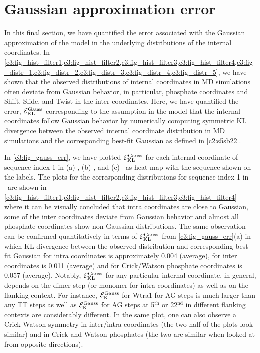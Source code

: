 \section{Gaussian approximation error}\label{c3:s7}
In this final section, we have quantified the error associated with the Gaussian approximation of the model in the underlying distributions of the internal coordinates.
In \cref{c3:fig_hist_filter1,c3:fig_hist_filter2,c3:fig_hist_filter3,c3:fig_hist_filter4,c3:fig_distr_1,c3:fig_distr_2,c3:fig_distr_3,c3:fig_distr_4,c3:fig_distr_5}, we have shown that the observed distributions of internal coordinates in MD simulations often deviate from Gaussian behavior, in particular, phosphate coordinates and Shift, Slide, and Twist in the inter-coordinates.
Here, we have quantified the error, ${\mathcal E}_{\text{KL}}^{\text{Gauss}}$ corresponding to the assumption in the model that the internal coordinates follow Gaussian behavior by numerically computing symmetric KL divergence between the observed internal coordinate distribution in MD simulations and the corresponding best-fit Gaussian as defined in \cref{c2:s5sb22}.

In \cref{c3:fig_gauss_err}, we have plotted ${\mathcal E}_{\text{KL}}^{\text{Gauss}}$ for each internal coordinate of sequence index 1 in (a) \Lbdna, (b) \Lbrna, and (c) \Lbdrh \ as heat map with the sequence shown on the labels. 
The plots for the corresponding distributions for sequence index 1 in \Lbdna \ are shown in \cref{c3:fig_hist_filter1,c3:fig_hist_filter2,c3:fig_hist_filter3,c3:fig_hist_filter4} where it can be visually concluded that intra coordinates are close to Gaussian, some of the inter coordinates deviate from Gaussian behavior and almost all phosphate coordinates show non-Gaussian distributions.
The same observation can be confirmed quantitatively in terms of  ${\mathcal E}_{\text{KL}}^{\text{Gauss}}$ from \cref{c3:fig_gauss_err}(a) in which KL divergence between the observed distribution and corresponding best-fit Gaussian for intra coordinates is approximately 0.004 (average), for inter coordinates is 0.011 (average) and for Crick/Watson phosphate coordinates is 0.057 (average).
Notably, ${\mathcal E}_{\text{KL}}^{\text{Gauss}}$ for any particular internal coordinate, in general, depends on the dimer step (or monomer for intra coordinates) as well as on the flanking context.
For instance, ${\mathcal E}_{\text{KL}}^{\text{Gauss}}$ for Wtra1 for AG steps is much larger than any TT steps as well as ${\mathcal E}_{\text{KL}}^{\text{Gauss}}$ for AG steps at 5$^\text{th}$ or 22$^\text{nd}$ in different flanking contexts are considerably different.
In the same plot, one can also observe a Crick-Watson symmetry in inter/intra coordinates (the two half of the plots look similar) and in Crick and Watson phosphates (the two are similar when looked at from opposite directions).

